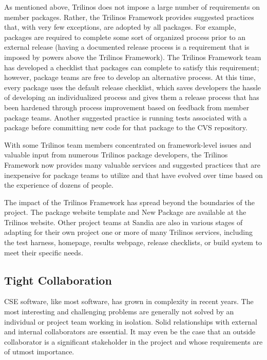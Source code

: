 \documentclass[12pt,relax]{article}
\begin{document}
As mentioned above, Trilinos does not impose a large number of requirements
on member packages.  Rather, the Trilinos Framework provides suggested 
practices that, with very few exceptions, are adopted by all packages.
For example, packages are required to complete some sort of organized
process prior to an external release (having a documented release
process is a requirement that is imposed by powers above the Trilinos
Framework).  The Trilinos Framework team has developed a checklist that
packages can complete to satisfy this requirement; however, package teams
are free to develop an alternative process.  At this time, every package
uses the default release checklist, which saves developers the hassle of
developing an individualized process and gives them a release process that
has been hardened through process improvement based on feedback from
member package teams.  Another suggested practice is running tests
associated with a package before committing new code for that package to the 
CVS repository.

With some Trilinos team members concentrated on framework-level issues and
valuable input from numerous Trilinos package developers, the Trilinos 
Framework now provides many valuable services and suggested practices that
are inexpensive for package teams to utilize and that have evolved over 
time based on the experience of dozens of people.  

The impact of the Trilinos Framework has spread beyond the boundaries of 
the project.  The package website template and New Package are available 
at the Trilinos website.  Other project teams at Sandia are also in various
stages of adapting for their own project one or more of many Trilinos
services, including the test harness, homepage, results webpage, 
release checklists, or build system to meet their specific needs.

\subsection{Tight Collaboration}

CSE software, like most software, has grown in complexity in recent years.
The most interesting and challenging problems are generally not solved by an
individual or project team working in isolation.  Solid relationships with 
external and internal collaborators are essential.  It may even be the case
that an outside collaborator is a significant stakeholder in the project and 
whose requirements are of utmost importance.
\end{document}
